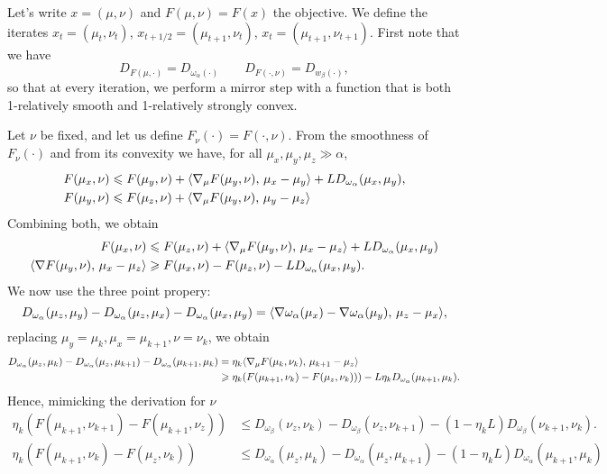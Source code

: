 \documentclass[a4paper, 10pt]{article}
\begin{document}
Let's write $x = (\mu, \nu)$  and $F(\mu, \nu) = F(x)$ the objective. We define the iterates $x_{t} = (\mu_t, \nu_t)$, $x_{t+1/2} = (\mu_{t+1}, \nu_t)$, 
$x_{t} = (\mu_{t+1}, \nu_{t+1})$. First note that we have
\begin{equation}
    D_{F(\mu, \cdot)} = D_{\omega_\alpha(\cdot)}\qquad D_{F(\cdot, \nu)} = D_{w_\beta(\cdot)},
\end{equation}
so that at every iteration, we perform a mirror step with a function that is both 1-relatively smooth and 1-relatively strongly convex.

Let $\nu$ be fixed, and let us define $F_\nu(\cdot) = F(\cdot, \nu)$. From the
smoothness of $F_\nu(\cdot)$ and from its convexity we have, for all 
$\mu_x, \mu_y, \mu_z \gg \alpha$,
\begin{align}
    F(\mu_x, \nu) &\leqslant F(\mu_y, \nu)
     + \langle \nabla_\mu F(\mu_y, \nu),\,\mu_x- \mu_y\rangle + L D_{\omega_\alpha}(\mu_x, \mu_y), \\
    F(\mu_y, \nu) &\leqslant F(\mu_z, \nu) + \langle \nabla_\mu F(\mu_y, \nu),\,\mu_y - \mu_z\rangle
\end{align}
Combining both, we obtain
\begin{align}
    F(\mu_x, \nu) &\leqslant F(\mu_z, \nu) + 
    \langle \nabla_\mu F(\mu_y, \nu),\,\mu_x - \mu_z\rangle + L D_{\omega_\alpha}(\mu_x, \mu_y) \\
    \langle \nabla F(\mu_y, \nu),\,\mu_x - \mu_z\rangle 
    &\geqslant F(\mu_x, \nu) - F(\mu_z, \nu) - L D_{\omega_\alpha}(\mu_x, \mu_y).
\end{align}
We now use the three point propery:
\begin{equation}
    D_{\omega_\alpha}(\mu_z, \mu_y) - D_{\omega_\alpha}(\mu_z, \mu_x) 
    - D_{\omega_\alpha}(\mu_x, \mu_y) 
    = \langle \nabla \omega_\alpha(\mu_x) - \nabla \omega_\alpha(\mu_y),\,\mu_z - \mu_x\rangle,
\end{equation}
replacing $\mu_y = \mu_{k}, \mu_x = \mu_{k+1}, \nu = \nu_k$, we obtain
\begin{align}
    D_{\omega_\alpha}(\mu_z, \mu_k) - D_{\omega_\alpha}(\mu_z, \mu_{k+1}) 
    - D_{\omega_\alpha}(\mu_{k+1}, \mu_k) &=
     \eta_k \langle \nabla_\mu F(\mu_k, \nu_k),\,\mu_{k+1} - \mu_z\rangle \\
    &\geqslant \eta_k (F(\mu_{k+1}, \nu_k) - F(\mu_z, \nu_k)))
     - L \eta_k D_{\omega_\alpha}   (\mu_{k+1},\mu_k).
\end{align}
Hence, mimicking the derivation for $\nu$
\begin{align}
    \eta_k (F(\mu_{k+1},\nu_{k+1}) - F(\mu_{k+1}, \nu_z)) &\leq 
    D_{\omega_\beta}(\nu_z, \nu_k) - D_{\omega_\beta}(\nu_z, \nu_{k+1}) 
    - (1 - \eta_k L) D_{\omega_\beta}(\nu_{k+1}, \nu_k). \\
    \eta_k (F(\mu_{k+1},\nu_k) - F(\mu_z, \nu_k)) &\leq 
    D_{\omega_\alpha}(\mu_z, \mu_k) - D_{\omega_\alpha}(\mu_z, \mu_{k+1}) 
    - (1 - \eta_k L) D_{\omega_\alpha}(\mu_{k+1}, \mu_k)
\end{align}
\end{document}
